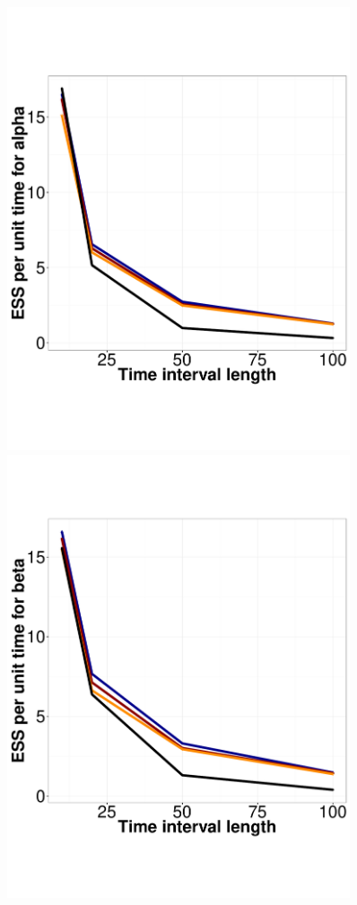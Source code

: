   \begin{figure}%
  \centering
  \begin{minipage}[hp]{0.45\linewidth}
  \centering
    \includegraphics [width=0.90\textwidth, angle=0]{figs/ESS_vs_t_alpha_fixobservation.pdf}
    \end{minipage}
  \begin{minipage}[hp]{0.45\linewidth}
  \centering
    \includegraphics [width=0.90\textwidth, angle=0]{figs/ESS_vs_t_beta_fixobservation.pdf}

\end{minipage}
\end{figure}

